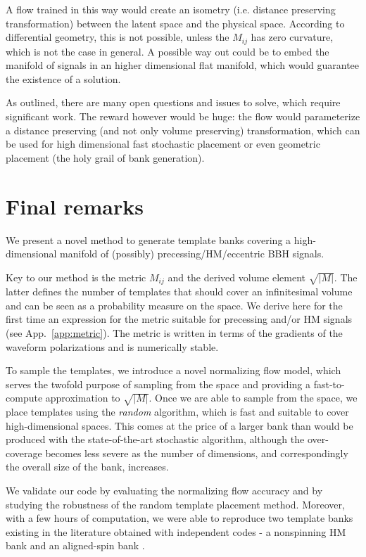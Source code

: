 \documentclass[twocolumn,showpacs,preprintnumbers,nofootinbib,prd,
superscriptaddress,10pt]{revtex4-2}
\begin{document}
A flow trained in this way would create an isometry (i.e. distance preserving transformation) between the latent space and the physical space. According to differential geometry, this is not possible, unless the $M_{ij}$ has zero curvature, which is not the case in general. A possible way out could be to embed the manifold of signals in an higher dimensional flat manifold, which would guarantee the existence of a solution.

As outlined, there are many open questions and issues to solve, which require significant work. The reward however would be huge: the flow would parameterize a distance preserving (and not only volume preserving) transformation, which can be used for high dimensional fast stochastic placement or even geometric placement (the holy grail of bank generation).

\section{Final remarks} \label{sec:conclusion}

We present a novel method to generate template banks covering a high-dimensional manifold of (possibly) precessing/HM/eccentric BBH signals.

Key to our method is the metric $M_{ij}$ and the derived volume element $\sqrt{|M|}$. The latter defines the number of templates that should cover an infinitesimal volume and can be seen as a probability measure on the space.
We derive here for the first time an expression for the metric suitable for precessing and/or HM signals (see App.~\ref{app:metric}). The metric is written in terms of the gradients of the waveform polarizations and is numerically stable.

To sample the templates, we introduce a novel normalizing flow model, which serves the twofold purpose of sampling from the space and providing a fast-to-compute approximation to $\sqrt{|M|}$.
Once we are able to sample from the space, we place templates using the {\it random} algorithm, which is fast and suitable to cover high-dimensional spaces.
This comes at the price of a larger bank than would be produced with the state-of-the-art stochastic algorithm, although the over-coverage becomes less severe as the number of dimensions, and correspondingly the overall size of the bank, increases.

We validate our code by evaluating the normalizing flow accuracy and by studying the robustness of the random template placement method.
Moreover, with a few hours of computation, we were able to reproduce two template banks existing in the literature obtained with independent codes - a nonspinning HM bank \cite{Harry:2017weg} and an aligned-spin bank \cite{Sakon:2022ibh}.
\end{document}
